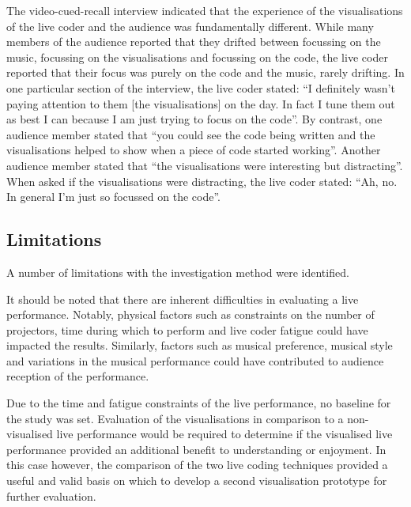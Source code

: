 The video-cued-recall interview indicated that the experience of the visualisations of the live coder and the audience was fundamentally different. While many members of the audience reported that they drifted between focussing on the music, focussing on the visualisations and focussing on the code, the live coder reported that their focus was purely on the code and the music, rarely drifting. In one particular section of the interview, the live coder stated: ``I definitely wasn't paying attention to them [the visualisations] on the day. In fact I tune them out as best I can because I am just trying to focus on the code''. By contrast, one audience member stated that ``you could see the code being written and the visualisations helped to show when a piece of code started working''. Another audience member stated that ``the visualisations were interesting but distracting''. When asked if the visualisations were distracting, the live coder stated: ``Ah, no. In general I'm just so focussed on the code''.


\subsection{Limitations}

A number of limitations with the investigation method were identified. 


It should be noted that there are inherent difficulties in evaluating a live performance. Notably, physical factors such as constraints on the number of projectors, time during which to perform and live coder fatigue could have impacted the results. Similarly, factors such as musical preference, musical style and variations in the musical performance could have contributed to audience reception of the performance. 

Due to the time and fatigue constraints of the live performance, no baseline for the study was set. Evaluation of the visualisations in comparison to a non-visualised live performance would be required to determine if the visualised live performance provided an additional benefit to understanding or enjoyment. In this case however, the comparison of the two live coding techniques provided a useful and valid basis on which to develop a second visualisation prototype for further evaluation.

